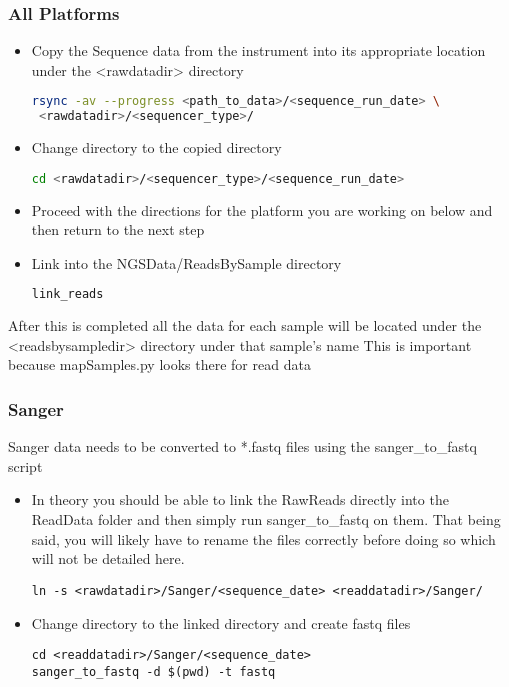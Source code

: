 \documentclass{article}
\begin{document}
\subsubsection{All Platforms}
\begin{itemize}
\item Copy the Sequence data from the instrument into its appropriate location under the <rawdatadir> directory
\begin{lstlisting}[language=bash]
rsync -av --progress <path_to_data>/<sequence_run_date> \
 <rawdatadir>/<sequencer_type>/
\end{lstlisting}

\item Change directory to the copied directory
{\tiny
\begin{lstlisting}[language=bash]
cd <rawdatadir>/<sequencer_type>/<sequence_run_date>
\end{lstlisting}
}

\item Proceed with the directions for the platform you are working on below and then return to the next step

\item Link into the NGSData/ReadsBySample directory
{\tiny
\begin{lstlisting}[language=bash]
link_reads
\end{lstlisting}
}
\end{itemize}

After this is completed all the data for each sample will be located under the <readsbysampledir> directory under that sample's name
This is important because mapSamples.py looks there for read data

\subsubsection{Sanger}
Sanger data needs to be converted to *.fastq files using the sanger\_to\_fastq script
\begin{itemize}
 \item In theory you should be able to link the RawReads directly into the ReadData folder and then simply run sanger\_to\_fastq on them. That being said, you will likely have to rename the files correctly before doing so which will not be detailed here.
\begin{lstlisting}
ln -s <rawdatadir>/Sanger/<sequence_date> <readdatadir>/Sanger/
\end{lstlisting}
 \item Change directory to the linked directory and create fastq files
\begin{lstlisting}
cd <readdatadir>/Sanger/<sequence_date>
sanger_to_fastq -d $(pwd) -t fastq
\end{lstlisting}
\end{itemize}
\end{document}
